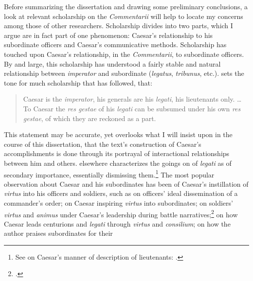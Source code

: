 \documentclass[12pt,letterpaper,oneside,final]{memoir}
\begin{document}
Before summarizing the dissertation and drawing some preliminary conclusions, a look at relevant scholarship on the \emph{Commentarii} will help to locate my concerns among those of other researchers. Scholarship divides  into two parts, which I argue are in fact part of one phenomenon: Caesar's relationship to his subordinate officers and Caesar's communicative methods. Scholarship has touched upon Caesar's relationship, in the \emph{Commentarii}, to subordinate officers. By and large, this scholarship has understood a fairly stable and natural relationship between \emph{imperator} and subordinate (\emph{legatus}, \emph{tribunus}, etc.). \textcite{adcock1956} sets the tone for much scholarship that has followed, that: \blockquote[{\cite[56]{adcock1956}}]{Caesar is the \emph{imperator}, his generals are his \emph{legati}, his lieutenants only. \ldots{} To Caesar the \emph{res gestae} of his \emph{legati} can be subsumed under his own \emph{res gestae}, of which they are reckoned as a part.} This statement may be accurate, yet overlooks what I will insist upon in the course of this dissertation, that the text's construction of Caesar's accomplishments is done through its portrayal of interactional relationships between him and others. \textcite{adcock1956} elsewhere characterizes the goings on of \emph{legati} as of secondary importance, essentially dismissing them.\footnote{See \textcite[73--76]{adcock1956} on Caesar's manner of description of lieutenants: .} The most popular observation about Caesar and his subordinates has been of Caesar's instillation of \emph{virtus} into his officers and soldiers, such as \textcite[131-133]{goldsworthy1996} on officers' ideal dissemination of a commander's order; \textcite{brown1999} on Caesar inspiring \emph{virtus} into subordinates; \textcite[304--322]{lendon1999} on soldiers' \emph{virtus} and \emph{animus} under Caesar's leadership during battle narratives;\footnote{.} \textcite{brown2004} on how Caesar leads centurions and \emph{legati} through \emph{virtus} and \emph{consilium}; \textcite[98--99]{welch1998} on how the author praises subordinates for their 
\end{document}
